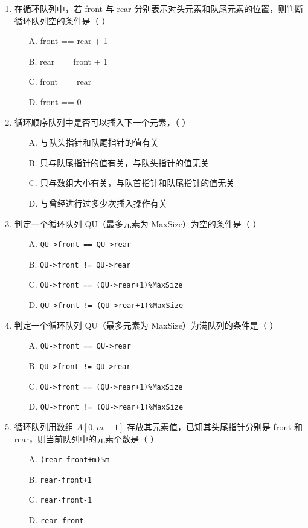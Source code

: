 \documentclass[12pt, a4paper]{article}
\begin{document}
\begin{enumerate}[label=\arabic*.]
	\item 在循环队列中，若 front 与 rear 分别表示对头元素和队尾元素的位置，则判断循环队列空的条件是（ ）
	      \begin{enumerate}
		      \item[A.] front == rear + 1
		      \item[B.] rear == front + 1
		      \item[C.] front == rear
		      \item[D.] front == 0
	      \end{enumerate}

	\item 循环顺序队列中是否可以插入下一个元素，（ ）
	      \begin{enumerate}
		      \item[A.] 与队头指针和队尾指针的值有关
		      \item[B.] 只与队尾指针的值有关，与队头指针的值无关
		      \item[C.] 只与数组大小有关，与队首指针和队尾指针的值无关
		      \item[D.] 与曾经进行过多少次插入操作有关
	      \end{enumerate}

	\item 判定一个循环队列 QU（最多元素为 MaxSize）为空的条件是（ ）
	      \begin{enumerate}
		      \item[A.] \texttt{QU->front == QU->rear}
		      \item[B.] \texttt{QU->front != QU->rear}
		      \item[C.] \texttt{QU->front == (QU->rear+1)\%MaxSize}
		      \item[D.] \texttt{QU->front != (QU->rear+1)\%MaxSize}
	      \end{enumerate}

	\item 判定一个循环队列 QU（最多元素为 MaxSize）为满队列的条件是（ ）
	      \begin{enumerate}
		      \item[A.] \texttt{QU->front == QU->rear}
		      \item[B.] \texttt{QU->front != QU->rear}
		      \item[C.] \texttt{QU->front == (QU->rear+1)\%MaxSize}
		      \item[D.] \texttt{QU->front != (QU->rear+1)\%MaxSize}
	      \end{enumerate}

	\item 循环队列用数组 $A[0, m-1]$ 存放其元素值，已知其头尾指针分别是 front 和 rear，则当前队列中的元素个数是（ ）
	      \begin{enumerate}
		      \item[A.] \texttt{(rear-front+m)\%m}
		      \item[B.] \texttt{rear-front+1}
		      \item[C.] \texttt{rear-front-1}
		      \item[D.] \texttt{rear-front}
	      \end{enumerate}


\end{enumerate}
\end{document}
